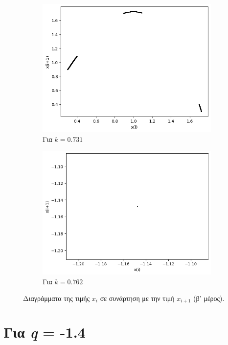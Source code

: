 \begin{figure}[ht]
\begin{subfigure}[b]{0.4\textwidth}
		\includegraphics[width=\textwidth]{LateX images/graphs q12/g11}
		\caption{Για $k=0.731$}
		\label{f:k67}
	\end{subfigure}
	\hfill
	\begin{subfigure}[b]{0.4\textwidth}
		\centering
		\includegraphics[width=\textwidth]{LateX images/graphs q12/g12}
		\caption{Για $k=0.762$}
		\label{f:k68}
	\end{subfigure}
	\hfill
	\caption{Διαγράμματα της τιμής \(x_i\) σε συνάρτηση με την τιμή \(x_{i+1}\) (β' μέρος).}	
\end{figure}

\clearpage

\section{Για \emph{q} = -1.4}

